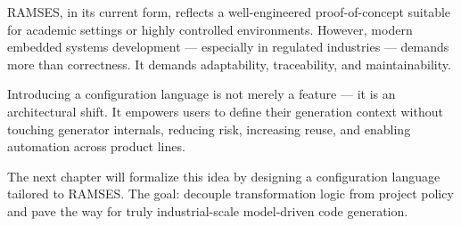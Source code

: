 RAMSES, in its current form, reflects a well-engineered proof-of-concept suitable for academic settings or highly controlled environments. However, modern embedded systems development — especially in regulated industries — demands more than correctness. It demands adaptability, traceability, and maintainability.

Introducing a configuration language is not merely a feature — it is an architectural shift. It empowers users to define their generation context without touching generator internals, reducing risk, increasing reuse, and enabling automation across product lines.

The next chapter will formalize this idea by designing a configuration language tailored to RAMSES. The goal: decouple transformation logic from project policy and pave the way for truly industrial-scale model-driven code generation.


